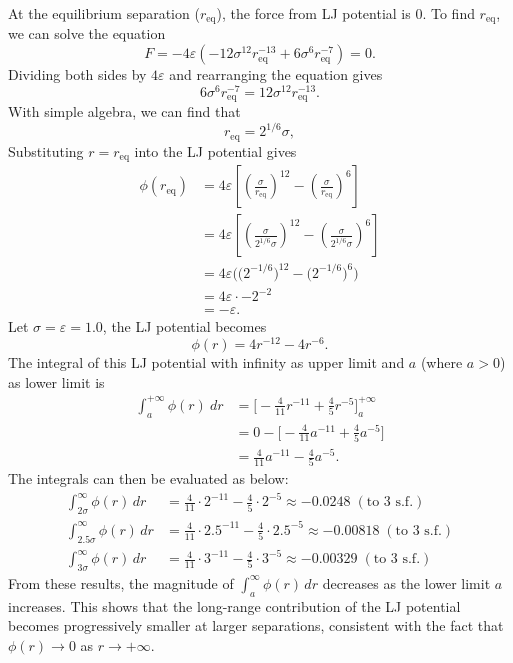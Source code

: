 \documentclass[a4paper,10pt,twocolumn]{article}
\begin{document}
At the equilibrium separation ($r_{\mathrm{eq}}$), the force from LJ potential is 0. To find $r_{\mathrm{eq}}$, we can solve the equation 
\[
F=-4\varepsilon\left(-12\sigma^{12}r_{\mathrm{eq}}^{-13}+6\sigma^{6}r_{\mathrm{eq}}^{-7} \right)=0.
\]
Dividing both sides by $4\varepsilon$ and rearranging the equation gives
\[
6\sigma^{6}r_{\mathrm{eq}}^{-7}=12\sigma^{12}r_{\mathrm{eq}}^{-13}.
\]
With simple algebra, we can find that
\[
r_{\mathrm{eq}}=2^{1/6}\sigma,
\]
Substituting $r=r_{\mathrm{\mathrm{eq}}}$ into the LJ potential gives
\begin{align*}
\phi(r_{\mathrm{eq}})
&= 4\varepsilon\left[\left(\frac{\sigma}{r_{\mathrm{eq}}}\right)^{12}-\left(\frac{\sigma}{r_{\mathrm{eq}}}\right)^6\right]
\\
&= 4\varepsilon\left[\left(\frac{\sigma}{2^{1/6}\sigma}\right)^{12}-\left(\frac{\sigma}{2^{1/6}\sigma}\right)^6\right]
\\
&= 4\varepsilon\Big(\big(2^{-1/6}\big)^{12}-\big(2^{-1/6}\big)^{6}\Big)
\\
&= 4\varepsilon\cdot-2^{-2}
\\
&= -\varepsilon.
\end{align*}
Let $\sigma=\varepsilon=1.0$, the LJ potential becomes
\[
\phi(r)=4r^{-12}-4r^{-6}.
\]
The integral of this LJ potential with infinity as upper limit and $a$ (where $a>0$) as lower limit is
\begin{align*}
\int^{+\infty}_{a} \phi(r)\ dr
&= \Big[-\frac{4}{11}r^{-11}+\frac{4}{5}r^{-5}\Big]^{+\infty}_{a}
\\
&= 0-\Big[-\frac{4}{11}a^{-11}+\frac{4}{5}a^{-5}\Big]
\\
&= \frac{4}{11}a^{-11}-\frac{4}{5}a^{-5}.
\end{align*}
The integrals can then be evaluated as below:
\begin{align*}
\int_{2\sigma}^{\infty}\phi(r)\,dr
&= \frac{4}{11}\cdot2^{-11}-\frac{4}{5}\cdot2^{-5}
\approx -0.0248 \; (\text{to 3 s.f.}) \\
\int_{2.5\sigma}^{\infty}\phi(r)\,dr
&= \frac{4}{11}\cdot2.5^{-11}-\frac{4}{5}\cdot2.5^{-5}
\approx -0.00818 \; (\text{to 3 s.f.}) \\
\int_{3\sigma}^{\infty}\phi(r)\,dr
&= \frac{4}{11}\cdot3^{-11}-\frac{4}{5}\cdot3^{-5}
\approx -0.00329 \; (\text{to 3 s.f.})
\end{align*}
From these results, the magnitude of $\int_{a}^{\infty}\phi(r)\,dr$ decreases as the lower limit $a$ increases. This shows that the long-range contribution of the LJ potential becomes progressively smaller at larger separations, consistent with the fact that $\phi(r)\to 0$ as $r\to+\infty$.
\end{document}
